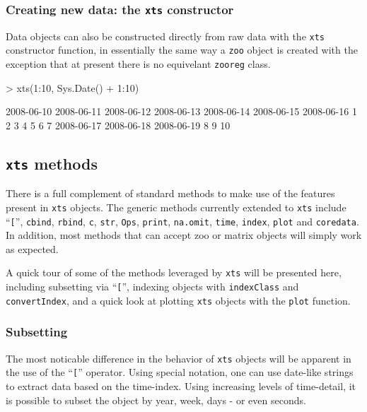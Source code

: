\documentclass{article}
\begin{document}
\subsubsection*{Creating new data: the {\tt xts} constructor}
Data objects can also be constructed directly from raw data with
the {\tt  xts} constructor function, in essentially the same way
a {\tt  zoo} object is created with the exception that at present
there is no equivelant {\tt zooreg} class.

\begin{Schunk}
\begin{Sinput}
> xts(1:10, Sys.Date() + 1:10)
\end{Sinput}
\begin{Soutput}
2008-06-10 2008-06-11 2008-06-12 2008-06-13 2008-06-14 2008-06-15 2008-06-16 
         1          2          3          4          5          6          7 
2008-06-17 2008-06-18 2008-06-19 
         8          9         10 
\end{Soutput}
\end{Schunk}

\subsection{{\tt xts} methods}
There is a full complement of standard methods to make use of the features
present in {\tt xts} objects. The generic methods currently
extended to {\tt xts} include ``{\tt [}'',
{\tt cbind}, {\tt rbind}, {\tt c}, {\tt str}, {\tt Ops},
{\tt print}, {\tt na.omit}, {\tt time}, {\tt index},
{\tt plot} and {\tt coredata}. In addition, most methods that can accept
zoo or matrix objects will simply work as expected.

A quick tour of some of the methods leveraged by {\tt xts}
will be presented here, including subsetting via ``{\tt [}'',
indexing objects with {\tt indexClass} and {\tt convertIndex},
and a quick look at plotting {\tt xts} objects with the {\tt plot}
function.

\subsubsection*{Subsetting}
The most noticable difference in the behavior of \texttt{xts} objects
will be apparent in the use of the ``{\tt [}'' operator. Using
special notation, one can use date-like strings to extract
data based on the time-index.  Using increasing levels of time-detail,
it is possible to subset the object by year, week, days - or even seconds.
\end{document}
